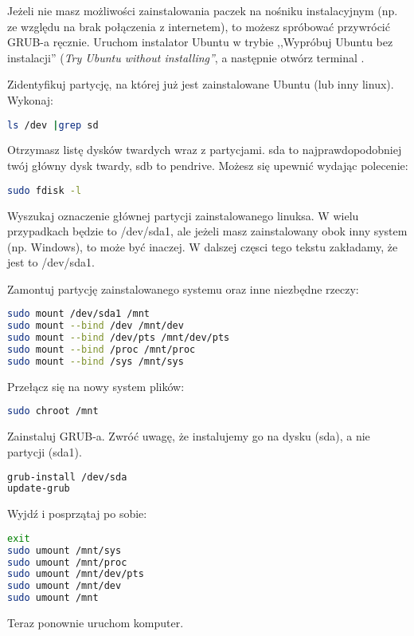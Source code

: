 Jeżeli nie masz możliwości zainstalowania paczek na nośniku instalacyjnym (np. ze względu na brak połączenia z internetem), to możesz spróbować przywrócić GRUB-a ręcznie. Uruchom instalator Ubuntu w trybie ,,Wypróbuj Ubuntu bez instalacji'' (\textit{Try Ubuntu without installing''}, a następnie otwórz terminal .

Zidentyfikuj partycję, na której już jest zainstalowane Ubuntu (lub inny linux). Wykonaj:

\begin{lstlisting}[language=bash]
ls /dev |grep sd
\end{lstlisting}

Otrzymasz listę dysków twardych wraz z partycjami. \textcolor{ubuntu_orange}{sda} to najprawdopodobniej twój główny dysk twardy, sdb to pendrive. Możesz się upewnić wydając polecenie:

\begin{lstlisting}[language=bash]
sudo fdisk -l
\end{lstlisting}

Wyszukaj oznaczenie głównej partycji zainstalowanego linuksa. W wielu przypadkach będzie to /dev/sda1, ale jeżeli masz zainstalowany obok inny system (np. Windows), to może być inaczej. W dalszej częsci tego tekstu zakładamy, że jest to /dev/sda1.

Zamontuj partycję zainstalowanego systemu oraz inne niezbędne rzeczy:
\begin{lstlisting}[language=bash]
sudo mount /dev/sda1 /mnt
sudo mount --bind /dev /mnt/dev
sudo mount --bind /dev/pts /mnt/dev/pts
sudo mount --bind /proc /mnt/proc
sudo mount --bind /sys /mnt/sys
\end{lstlisting}

Przełącz się na nowy system plików:

\begin{lstlisting}[language=bash]
sudo chroot /mnt
\end{lstlisting}

Zainstaluj GRUB-a. Zwróć uwagę, że instalujemy go na dysku (sda), a nie partycji (sda1).

\begin{lstlisting}[language=bash]
grub-install /dev/sda
update-grub
\end{lstlisting}

Wyjdź i posprzątaj po sobie:

\begin{lstlisting}[language=bash]
exit
sudo umount /mnt/sys
sudo umount /mnt/proc
sudo umount /mnt/dev/pts
sudo umount /mnt/dev
sudo umount /mnt
\end{lstlisting}

Teraz ponownie uruchom komputer.
\clearpage
